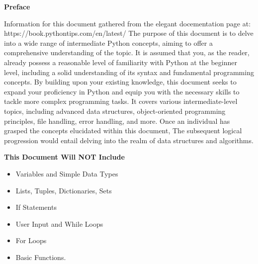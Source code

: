 \documentclass{report}
\begin{document}
    \bigbreak \noindent 
    \begin{Large}
        \textbf{Preface}
    \end{Large}
    \bigbreak \noindent 
    Information for this document gathered from the elegant docementation page at:
    \bigbreak \noindent 
    https://book.pythontips.com/en/latest/
    \bigbreak \noindent 
    The purpose of this document is to delve into a wide range of intermediate Python concepts, aiming to offer a comprehensive understanding of the topic. It is assumed that you, as the reader, already possess a reasonable level of familiarity with Python at the beginner level, including a solid understanding of its syntax and fundamental programming concepts.
    \bigbreak \noindent 
    By building upon your existing knowledge, this document seeks to expand your proficiency in Python and equip you with the necessary skills to tackle more complex programming tasks. It covers various intermediate-level topics, including advanced data structures, object-oriented programming principles, file handling, error handling, and more.
    \bigbreak \noindent 
    Once an individual has grasped the concepts elucidated within this document, The subsequent logical progression would entail delving into the realm of data structures and algorithms.
    \bigbreak \noindent \bigbreak \noindent 
    \begin{large}
        \textbf{This Document Will NOT Include}
    \end{large}
    \begin{itemize}
        \item Variables and Simple Data Types
        \item Lists, Tuples, Dictionaries, Sets
        \item If Statements
        \item User Input and While Loops
        \item For Loops
        \item Basic Functions.
    \end{itemize}
    \bigbreak \noindent 
    \pagebreak \bigbreak \noindent
    \tableofcontents
    \pagebreak \bigbreak \noindent 
\end{document}
